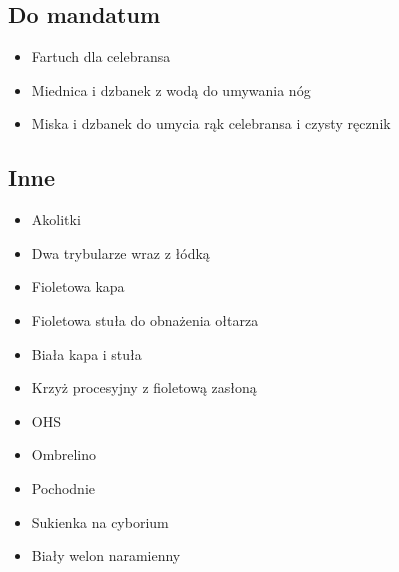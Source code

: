 \subsection{Do mandatum}

\begin{itemize}
    \item Fartuch dla celebransa
    \item Miednica i dzbanek z wodą do umywania nóg
    \item Miska i dzbanek do umycia rąk celebransa i czysty ręcznik
\end{itemize}

\subsection{Inne}

\begin{itemize}
    \item Akolitki
    \item Dwa trybularze wraz z łódką
    \item {\color{violet} Fioletowa} kapa
    \item {\color{violet} Fioletowa} stuła do obnażenia ołtarza 
    \item Biała kapa i stuła
    \item Krzyż procesyjny z {\color{violet} fioletową} zasłoną
    \item OHS
    \item Ombrelino
    \item Pochodnie
    \item Sukienka na cyborium
    \item Biały welon naramienny
\end{itemize}
